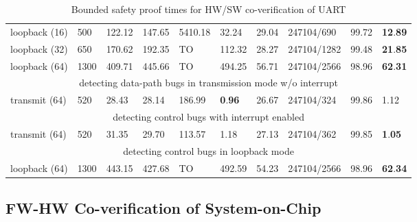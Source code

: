 \documentclass[sigconf]{acmart}
\begin{document}
\begin{table}
\begin{center}
{\begin{scriptsize}
\begin{tabular}{|l|l|l|l|l|l|l|l|l|l|}
loopback (16) & 500 & 122.12 & 147.65 & 5410.18 & 32.24 & 29.04 & 247104/690 & 99.72 & \textbf{12}.\textbf{89} \\ 
loopback (32) & 650 & 170.62 & 192.35 & TO & 112.32 & 28.27 & 247104/1282 & 99.48 & \textbf{21}.\textbf{85}   \\ 
loopback (64) & 1300 & 409.71 & 445.66 & TO & 494.25 & 56.71 & 247104/2566 & 98.96 & \textbf{62}.\textbf{31}  \\ \hline
\multicolumn{10}{|c|}{detecting data-path bugs in transmission mode w/o interrupt} \\ \hline
transmit (64) & 520 & 28.43 & 28.14 & 186.99 & \textbf{0}.\textbf{96} & 26.67 &
247104/324 & 99.86 & 1.12 \\ \hline
\multicolumn{10}{|c|}{detecting control bugs with interrupt enabled} \\ \hline
transmit (64) & 520 & 31.35 & 29.70 & 113.57 & 1.18 & 27.13 & 247104/362 & 99.85 & \textbf{1}.\textbf{05} \\ \hline
\multicolumn{10}{|c|}{detecting control bugs in loopback mode} \\ \hline
loopback (64) & 1300 & 443.15 & 427.68 & TO & 492.59 & 54.23 & 247104/2566 &
98.96 & \textbf{62}.\textbf{34} \\ \hline
\end{tabular}
\end{scriptsize}
}
\end{center}
\vspace{-1.3mm}
\caption{Bounded safety proof times for HW/SW co-verification of UART 
\label{table:safe}}
\end{table}

\subsection{FW-HW Co-verification of System-on-Chip}
\end{document}
